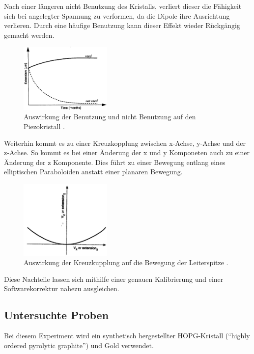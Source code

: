 Nach einer längeren nicht Benutzung des Kristalls, verliert dieser die Fähigkeit sich bei angelegter Spannung zu verformen, da die Dipole ihre Ausrichtung verlieren.
Durch eine häufige Benutzung kann dieser Effekt wieder Rückgängig gemacht werden.
\begin{figure}[!h]
    \centering
    \includegraphics[width=0.4\textwidth]{images/aging.JPG}
    \caption{Auswirkung der Benutzung und nicht Benutzung auf den Piezokristall \cite{STM-Literatur}.}
\end{figure}

Weiterhin kommt es zu einer Kreuzkopplung zwischen x-Achse, y-Achse und der z-Achse.
So kommt es bei einer Änderung der x und y Komponeten auch zu einer Änderung der z Komponente.
Dies führt zu einer Bewegung entlang eines elliptischen Paraboloiden anstatt einer planaren Bewegung.
\begin{figure}[!h]
    \centering
    \includegraphics[width=0.4\textwidth]{images/Kreuzkupplung.JPG}
    \caption{Auswirkung der Kreuzkupplung auf die Bewegung der Leiterspitze \cite{STM-Literatur}.}
\end{figure}

Diese Nachteile lassen sich mithilfe einer genauen Kalibrierung und einer Softwarekorrektur nahezu ausgleichen.

\subsection{Untersuchte Proben} %
\label{sub:proben}

Bei diesem Experiment wird ein synthetisch hergestellter HOPG-Kristall ("`highly ordered pyrolytic graphite"') und Gold verwendet.

